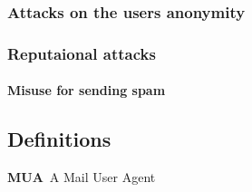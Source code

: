 \documentclass[11pt,a4paper]{book}
\newenvironment{entry}{\par\leavevmode\hangpara{1.5mm}{1}\ignorespaces}{\RaggedRight\par}
\newcommand*{\mainentry}[1]{{\bfseries{#1}}~}
\begin{document}
\subsection{Attacks on the users anonymity}
\subsection{Reputaional attacks}
\subsubsection{Misuse for sending spam}
\begin{appendices}
\chapter{Definitions}
\begin{entry}
\mainentry{MUA}{A Mail User Agent}
\end{entry}

\printbibliography
\end{appendices}
\end{document}
